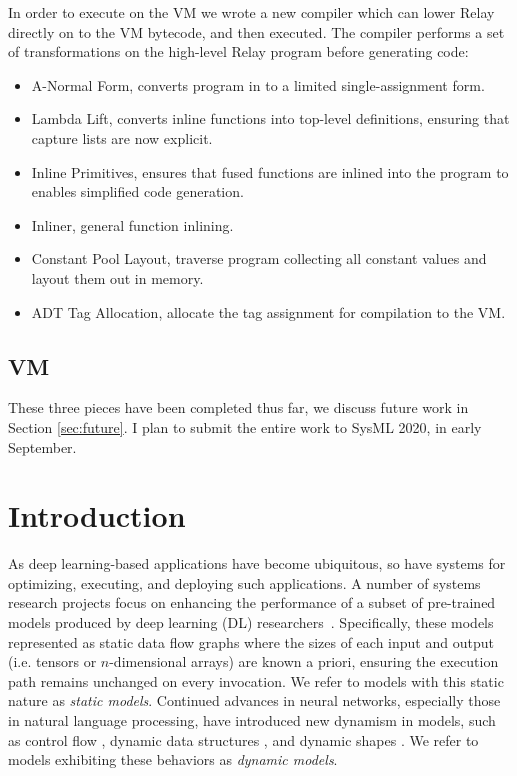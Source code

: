 In order to execute on the VM we wrote a new compiler which
  can lower Relay directly on to the VM bytecode, and then
  executed.
The compiler performs a set of transformations on the high-level
  Relay program before generating code:
\begin{itemize}
  \item A-Normal Form, converts program in to a limited single-assignment form.
  \item Lambda Lift, converts inline functions into top-level definitions,
        ensuring that capture lists are now explicit.
  \item Inline Primitives, ensures that fused functions are inlined into
        the program to enables simplified code generation.
  \item Inliner, general function inlining.
  \item Constant Pool Layout, traverse program collecting all constant values
        and layout them out in memory.
  \item ADT Tag Allocation, allocate the tag assignment for compilation
        to the VM.
\end{itemize}

\subsection{VM}

These three pieces have been completed thus far, we discuss future work in Section
\ref{sec:future}. I plan to submit the entire work to SysML 2020, in early September.


\section{Introduction}
\label{sec:nimble-intro}

As deep learning-based applications have become ubiquitous, so have systems for optimizing, executing, and deploying such applications. A number of systems research projects focus on enhancing the performance of a subset of pre-trained models produced by deep learning (DL) researchers~\citep{Dahl2011taslp, yu2011improved, han2016isca, NIPS2016johnson}.
Specifically, these models represented as static data flow graphs where the sizes of each input and output (i.e. tensors or $n$-dimensional arrays) are known a priori, ensuring the execution path remains unchanged on every invocation.
We refer to models with this static nature as \emph{static models}.
Continued advances in neural networks, especially those in natural language processing, have introduced new dynamism in models, such as control flow \citep{lstm, language_model}, dynamic data structures \citep{tree_lstm, graph_lstm}, and dynamic shapes \citep{devlin2018bert}. We refer to models exhibiting these behaviors as {\em dynamic models}.


